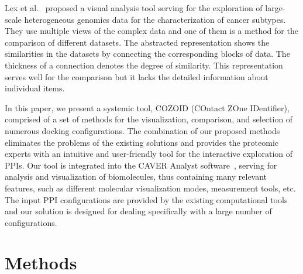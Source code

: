 \documentclass{bmcart}
\def\MatView {Matrix view\xspace}
\begin{document}
Lex et al.~\cite{Lex2012} proposed a visual analysis tool serving for the exploration of large-scale heterogeneous genomics data for the characterization of cancer subtypes.
They use multiple views of the complex data and one of them is a method for the comparison of different datasets.
The abstracted representation shows the similarities in the datasets by connecting the corresponding blocks of data. 
The thickness of a connection denotes the degree of similarity. 
This representation serves well for the comparison but it lacks the detailed information about individual items.


In this paper, we present a systemic tool, COZOID (COntact ZOne IDentifier), comprised of a set of methods for the visualization, comparison, and selection of numerous docking configurations.
The combination of our proposed methods eliminates the problems of the existing solutions and provides the proteomic experts with an intuitive and user-friendly tool for the interactive exploration of PPIs.
Our tool is integrated into the CAVER Analyst software~\cite{kozlikova2014caver}, serving for analysis and visualization of biomolecules, thus containing many relevant features, such as different molecular visualization modes, measurement tools, etc.  
The input PPI configurations are provided by the existing computational tools and our solution is designed for dealing specifically with a large number of configurations.

\section*{Methods}
\end{document}
